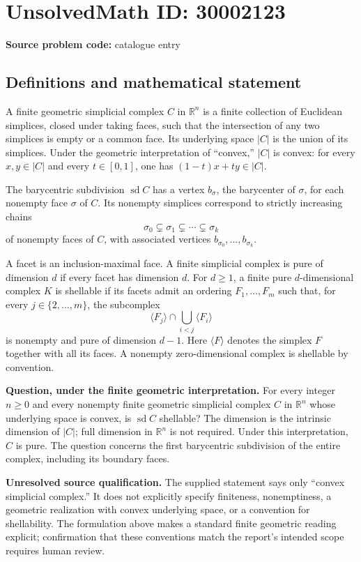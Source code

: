 \documentclass[11pt]{article}
\newcommand{\R}{\mathbb{R}}
\begin{document}
\section*{UnsolvedMath ID: 30002123}
\textbf{Source problem code:} catalogue entry
\subsection{Definitions and mathematical statement}
A finite geometric simplicial complex \(C\) in \(\R^n\) is a finite collection of Euclidean simplices, closed under taking faces, such that the intersection of any two simplices is empty or a common face. Its underlying space \(|C|\) is the union of its simplices. Under the geometric interpretation of ``convex,'' \(|C|\) is convex: for every \(x,y\in |C|\) and every \(t\in[0,1]\), one has \((1-t)x+ty\in |C|\).

The barycentric subdivision \(\operatorname{sd} C\) has a vertex \(b_\sigma\), the barycenter of \(\sigma\), for each nonempty face \(\sigma\) of \(C\). Its nonempty simplices correspond to strictly increasing chains
\[
\sigma_0\subsetneq\sigma_1\subsetneq\cdots\subsetneq\sigma_k
\]
of nonempty faces of \(C\), with associated vertices \(b_{\sigma_0},\ldots,b_{\sigma_k}\).

A facet is an inclusion-maximal face. A finite simplicial complex is pure of dimension \(d\) if every facet has dimension \(d\). For \(d\geq1\), a finite pure \(d\)-dimensional complex \(K\) is shellable if its facets admit an ordering \(F_1,\ldots,F_m\) such that, for every \(j\in\{2,\ldots,m\}\), the subcomplex
\[
\langle F_j\rangle\cap\bigcup_{i<j}\langle F_i\rangle
\]
is nonempty and pure of dimension \(d-1\). Here \(\langle F\rangle\) denotes the simplex \(F\) together with all its faces. A nonempty zero-dimensional complex is shellable by convention.

\textbf{Question, under the finite geometric interpretation.} For every integer \(n\geq0\) and every nonempty finite geometric simplicial complex \(C\) in \(\R^n\) whose underlying space is convex, is \(\operatorname{sd} C\) shellable? The dimension is the intrinsic dimension of \(|C|\); full dimension in \(\R^n\) is not required. Under this interpretation, \(C\) is pure. The question concerns the first barycentric subdivision of the entire complex, including its boundary faces.

\textbf{Unresolved source qualification.} The supplied statement says only ``convex simplicial complex.'' It does not explicitly specify finiteness, nonemptiness, a geometric realization with convex underlying space, or a convention for shellability. The formulation above makes a standard finite geometric reading explicit; confirmation that these conventions match the report's intended scope requires human review.
\end{document}
